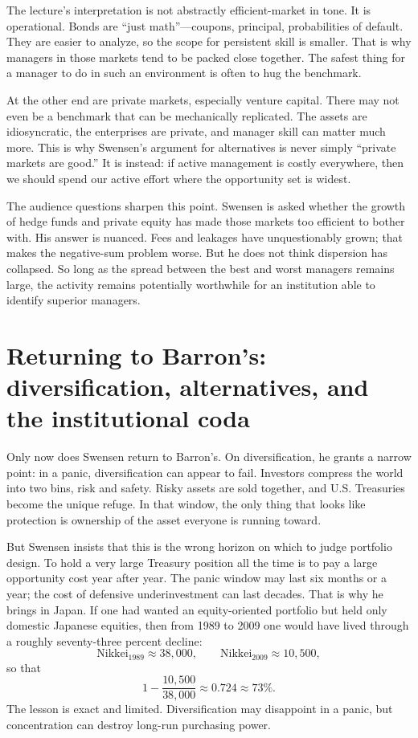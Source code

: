 The lecture's interpretation is not abstractly efficient-market in tone. It is operational. Bonds are ``just math''---coupons, principal, probabilities of default. They are easier to analyze, so the scope for persistent skill is smaller. That is why managers in those markets tend to be packed close together. The safest thing for a manager to do in such an environment is often to hug the benchmark.

At the other end are private markets, especially venture capital. There may not even be a benchmark that can be mechanically replicated. The assets are idiosyncratic, the enterprises are private, and manager skill can matter much more. This is why Swensen's argument for alternatives is never simply ``private markets are good.'' It is instead: if active management is costly everywhere, then we should spend our active effort where the opportunity set is widest.

The audience questions sharpen this point. Swensen is asked whether the growth of hedge funds and private equity has made those markets too efficient to bother with. His answer is nuanced. Fees and leakages have unquestionably grown; that makes the negative-sum problem worse. But he does not think dispersion has collapsed. So long as the spread between the best and worst managers remains large, the activity remains potentially worthwhile for an institution able to identify superior managers.

\section{Returning to Barron's: diversification, alternatives, and the institutional coda}

Only now does Swensen return to Barron's. On diversification, he grants a narrow point: in a panic, diversification can appear to fail. Investors compress the world into two bins, risk and safety. Risky assets are sold together, and U.S. Treasuries become the unique refuge. In that window, the only thing that looks like protection is ownership of the asset everyone is running toward.

But Swensen insists that this is the wrong horizon on which to judge portfolio design. To hold a very large Treasury position all the time is to pay a large opportunity cost year after year. The panic window may last six months or a year; the cost of defensive underinvestment can last decades. That is why he brings in Japan. If one had wanted an equity-oriented portfolio but held only domestic Japanese equities, then from 1989 to 2009 one would have lived through a roughly seventy-three percent decline:
\begin{equation}
\text{Nikkei}_{1989}\approx 38{,}000,\qquad \text{Nikkei}_{2009}\approx 10{,}500,
\end{equation}
so that
\begin{equation}
1-\frac{10{,}500}{38{,}000}\approx 0.724 \approx 73\%.
\end{equation}
The lesson is exact and limited. Diversification may disappoint in a panic, but concentration can destroy long-run purchasing power.

